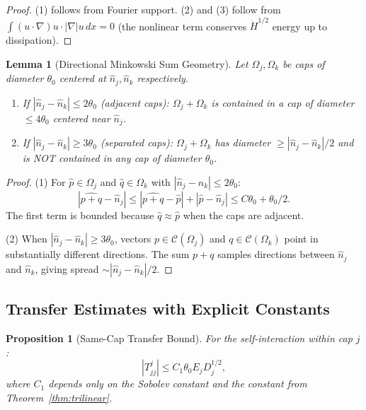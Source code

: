 \documentclass[11pt]{article}
\newtheorem{lemma}[theorem]{Lemma}
\newtheorem{proposition}[theorem]{Proposition}
\theoremstyle{definition}
\begin{document}
\begin{proof}
(1) follows from Fourier support. (2) and (3) follow from $\int (u \cdot \nabla)u \cdot |\nabla|u \, dx = 0$ (the nonlinear term conserves $\dot{H}^{1/2}$ energy up to dissipation).
\end{proof}

\begin{lemma}[Directional Minkowski Sum Geometry]\label{lem:minkowski}
Let $\Omega_j, \Omega_k$ be caps of diameter $\theta_0$ centered at $\hat{n}_j, \hat{n}_k$ respectively.
\begin{enumerate}
\item If $|\hat{n}_j - \hat{n}_k| \leq 2\theta_0$ (adjacent caps): $\Omega_j + \Omega_k$ is contained in a cap of diameter $\leq 4\theta_0$ centered near $\hat{n}_j$.

\item If $|\hat{n}_j - \hat{n}_k| \geq 3\theta_0$ (separated caps): $\Omega_j + \Omega_k$ has diameter $\geq |\hat{n}_j - \hat{n}_k|/2$ and is NOT contained in any cap of diameter $\theta_0$.
\end{enumerate}
\end{lemma}

\begin{proof}
(1) For $\hat{p} \in \Omega_j$ and $\hat{q} \in \Omega_k$ with $|\hat{n}_j - \hat{n}_k| \leq 2\theta_0$:
\begin{equation}
|\widehat{p+q} - \hat{n}_j| \leq |\widehat{p+q} - \hat{p}| + |\hat{p} - \hat{n}_j| \leq C\theta_0 + \theta_0/2.
\end{equation}
The first term is bounded because $\hat{q} \approx \hat{p}$ when the caps are adjacent.

(2) When $|\hat{n}_j - \hat{n}_k| \geq 3\theta_0$, vectors $p \in \mathcal{C}(\Omega_j)$ and $q \in \mathcal{C}(\Omega_k)$ point in substantially different directions. The sum $p + q$ samples directions between $\hat{n}_j$ and $\hat{n}_k$, giving spread $\sim |\hat{n}_j - \hat{n}_k|/2$.
\end{proof}

\subsection{Transfer Estimates with Explicit Constants}

\begin{proposition}[Same-Cap Transfer Bound]\label{prop:same-cap}
For the self-interaction within cap $j$:
\begin{equation}
|T_{jj}^j| \leq C_1 \theta_0 E_j D_j^{1/2},
\end{equation}
where $C_1$ depends only on the Sobolev constant and the constant from Theorem~\ref{thm:trilinear}.
\end{proposition}
\end{document}
